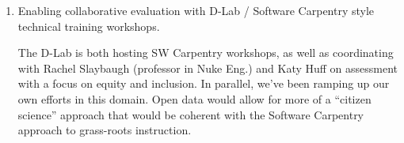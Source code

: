 \begin{enumerate}
    \item Enabling collaborative evaluation with D-Lab / Software Carpentry style
        technical training workshops.

        The D-Lab is both hosting SW Carpentry workshops, as well as
        coordinating with Rachel Slaybaugh (professor in Nuke Eng.) and Katy
        Huff on assessment with a focus on equity and inclusion. In parallel,
        we've been ramping up our own efforts in this domain. Open data would
        allow for more of a “citizen science” approach that would be coherent
        with the Software Carpentry approach to grass-roots instruction.

\end{enumerate}



